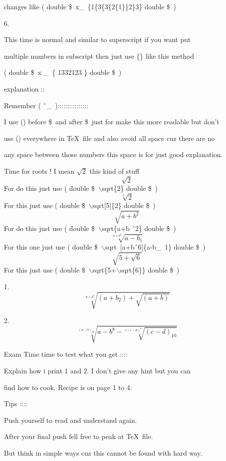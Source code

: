 \documentclass[11pt]{article}
\begin{document}
 changes like ( double \$\ x\_\ \{1\{3\{3\{2\{1\}\}2\}3\} double \$\ )
 
 \vspace{2cm}
 
 6.
 
 This time is normal and similar to superscript if you want put
 
  multiple numbers in subscript then just use \{\} like this method
 
 ( double \$\ x \_\ \{ 1332123 \} double \$\ )
 
 \vspace{2cm}
 
  explanation ::

 Remember ( \^\  \_\ )::::::::::::::::
 
 I use () before \$\ and after \$\ just for make this more readable but don't
 
 use () everywhere in \TeX\ file and also avoid all space cuz there are no
 
any space between those numbers this space is for just good explanation.

\pagebreak

Time for roots ! I mean  $\sqrt{2}$ this kind of stuff
$$\sqrt{2}$$
For do this just use ( double \$\ $\backslash$sqrt\{2\} double \$\ )
$$\sqrt[5]{2}$$
For this just use ( double \$\ $\backslash$sqrt[5]\{2\} double \$\ )
$$\sqrt{a+b^2}$$
For do this just use ( double \$\ $\backslash$sqrt\{a+b \^\ 2\} double \$\ )
$$\sqrt[a+b^6]{a-b_1}$$
For this one just use ( double \$\ $\backslash$sqrt\ [a+b\^\ 6]\{a-b\_\ 1\} double \$\ )
$$\sqrt{5+\sqrt{6}}$$
For this just use ( double \$\ $\backslash$sqrt\{5+$\backslash$sqrt\{6\}\} double \$\ )

1. 
$$\sqrt[a+b^3]{(a+b_2)+\sqrt{(a+b)}}$$

2.
$$\sqrt[(a-b)_10]{a-b^8-\sqrt[r(c-d)^8]{(c-d)_{10}}}$$

Exam Time time to test what you get :::: 

Explain how i print 1 and 2. I don't give any hint but you can

find how to cook. Recipe is on page 1 to 4.

Tips ::::

Push yourself to read and understand again.

After your final push fell free to peak at \TeX\ file.

But think in simple ways cuz this cannot be found with hard way.

\pagebreak
\end{document}
